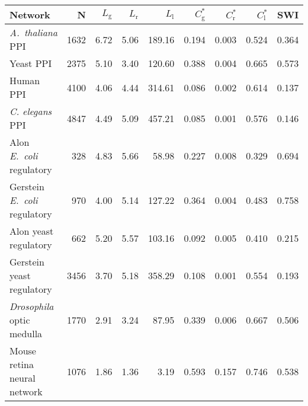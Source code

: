 \begin{tabular}{lrrrrrrrr}
\hline
Network & N  & $L_{\mathrm{g}}$ & $L_{\mathrm{r}}$ & $L_{\mathrm{l}}$ & $C^\ast_{\mathrm{g}}$ & $C^\ast_{\mathrm{r}}$ & $C^\ast_{\mathrm{l}}$ &  SWI \\
\hline
\textit{A.~thaliana} PPI & 1632 & 6.72 & 5.06 & 189.16 & 0.194 & 0.003 & 0.524 & 0.364\\
Yeast PPI & 2375 & 5.10 & 3.40 & 120.60 & 0.388 & 0.004 & 0.665 & 0.573\\
Human PPI & 4100 & 4.06 & 4.44 & 314.61 & 0.086 & 0.002 & 0.614 & 0.137\\
\textit{C. elegans} PPI & 4847 & 4.49 & 5.09 & 457.21 & 0.085 & 0.001 & 0.576 & 0.146\\
Alon \textit{E.~coli} regulatory & 328 & 4.83 & 5.66 & 58.98 & 0.227 & 0.008 & 0.329 & 0.694\\
Gerstein \textit{E.~coli} regulatory & 970 & 4.00 & 5.14 & 127.22 & 0.364 & 0.004 & 0.483 & 0.758\\
Alon yeast regulatory & 662 & 5.20 & 5.57 & 103.16 & 0.092 & 0.005 & 0.410 & 0.215\\
Gerstein yeast regulatory & 3456 & 3.70 & 5.18 & 358.29 & 0.108 & 0.001 & 0.554 & 0.193\\
\textit{Drosophila} optic medulla & 1770 & 2.91 & 3.24 & 87.95 & 0.339 & 0.006 & 0.667 & 0.506\\
Mouse retina neural network & 1076 & 1.86 & 1.36 & 3.19 & 0.593 & 0.157 & 0.746 & 0.538\\
\hline
\end{tabular}
